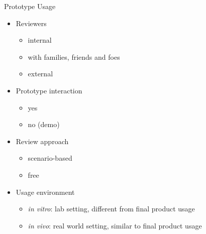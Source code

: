 \begin{Slide}{Prototype Usage}
\begin{itemize}
\item Reviewers 
\begin{itemize}
\item internal
\item with families, friends and foes
\item external
\end{itemize}
\item Prototype interaction 
\begin{itemize}
\item yes 
\item no (demo)
\end{itemize}
\item Review approach
\begin{itemize}
\item scenario-based
\item free
\end{itemize}
\item Usage environment
\begin{itemize}
\item \textit{in vitro}: lab setting, different from final product usage 
\item \textit{in vivo}: real world setting, similar to final product usage

\end{itemize}
\end{itemize}
\end{Slide}